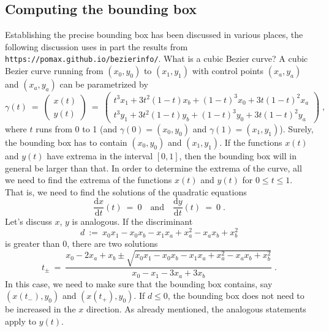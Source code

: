 \documentclass{article}
\begin{document}
\clearpage
\subsection*{Computing the bounding box}

Establishing the precise bounding box has been discussed in various places, the
following discussion uses in part the results from
\texttt{https://pomax.github.io/bezierinfo/}. What is a cubic Bezier curve? A
cubic Bezier curve running from $(x_0,y_0)$ to $(x_1,y_1)$ with control points
$(x_a,y_a)$ and $(x_a,y_a)$ can be parametrized by
\begin{equation}
 \gamma(t)~=~
 \begin{pmatrix} x(t)\\ y(t) \end{pmatrix}~=~
 \begin{pmatrix}t^3 x_{1}+3 t^2 (1-t) x_{b}+(1-t)^3
   x_{0}+3 t (1-t)^2 x_{a}\\
   t^3 y_{1}+3
   t^2 (1-t) y_{b}+(1-t)^3 y_{0}+3 t (1-t)^2
   y_{a}\end{pmatrix}\;,
\end{equation}
where $t$ runs from 0 to 1 (and $\gamma(0)=(x_0,y_0)$ and
$\gamma(1)=(x_1,y_1)$). Surely, the bounding box has to contain
$(x_0,y_0)$ and $(x_1,y_1)$. If the functions $x(t)$ and $y(t)$ have extrema in
the interval $[0,1]$, then the bounding box will in general be larger than that.
In order to determine the extrema of the curve, all
we need to find the extrema of the functions $x(t)$ and $y(t)$ for $0\le t\le
1$. That is, we need to find the solutions of the quadratic equations
\begin{equation}
 \frac{\mathrm{d}x}{\mathrm{d}t}(t)~=~0\quad\text{and}\quad
 \frac{\mathrm{d}y}{\mathrm{d}t}(t)~=~0\;.
\end{equation}
Let's discuss $x$, $y$ is analogous. If the discriminant
\begin{equation}
 d~:=~x_{0} x_{1}-x_{0}
   x_{b}-x_{1}
   x_{a}+x_{a}^2-x_{a}
   x_{b}+x_{b}^2
\end{equation}
is greater than 0, there are two solutions
\begin{equation}
 t_\pm~=~\frac{x_{0}-2
   x_{a}+x_{b}\pm\sqrt{x_{0} x_{1}-x_{0}
   x_{b}-x_{1}
   x_{a}+x_{a}^2-x_{a}
   x_{b}+x_{b}^2}}{x_{0}-x_{1}-3
   x_{a}+3 x_{b}} \;.
\end{equation}   
In this case, we need to make sure that the bounding box contains, say
$(x(t_-),y_0)$ and $(x(t_+),y_0)$. If $d\le0$, the bounding box does not need to
be increased in the $x$ direction. As already mentioned, the analogous
statements apply to $y(t)$. 
\end{document}
